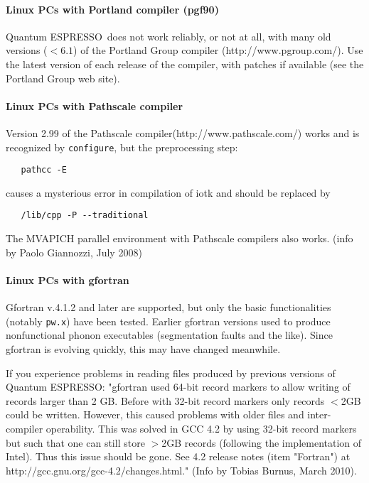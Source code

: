 \documentclass[12pt,a4paper]{article}
\def\qe{{\sc Quantum ESPRESSO}}
\def\pw.x{\texttt{pw.x}}
\def\configure{\texttt{configure}}
\begin{document}
\paragraph{Linux PCs with Portland compiler (pgf90)}

\qe\ does not work reliably, or not at all, with many old
versions ($< 6.1$) of the Portland Group compiler 
(http://www.pgroup.com/). Use the latest version of each 
release of the compiler, with patches if available (see
the Portland Group web site).

\paragraph{Linux PCs with Pathscale compiler}

Version 2.99 of the Pathscale compiler(http://www.pathscale.com/)
works and is recognized by
\configure, but the preprocessing step:
\begin{verbatim}
   pathcc -E
\end{verbatim}
causes a mysterious error in compilation of iotk and should be replaced by
\begin{verbatim}
   /lib/cpp -P --traditional
\end{verbatim}
The MVAPICH parallel environment with Pathscale compilers also works.
(info by Paolo Giannozzi, July 2008)

\paragraph{Linux PCs with gfortran}

Gfortran v.4.1.2 and later are supported, but only the basic functionalities 
(notably \pw.x) have been tested.  Earlier gfortran versions used to produce
nonfunctional phonon executables (segmentation faults and the like). Since
gfortran is evolving quickly, this may have changed meanwhile.

If you experience problems in reading files produced by previous versions
of \qe: "gfortran used 64-bit record markers to allow writing of records 
larger than 2 GB. Before with 32-bit record markers only records $<$2GB 
could be written. However, this caused problems with older files and 
inter-compiler operability. This was solved in GCC 4.2 by using 32-bit 
record markers but such that one can still store $>$2GB records (following 
the implementation of Intel). Thus this issue should be gone. See 4.2 
release notes (item "Fortran") at http://gcc.gnu.org/gcc-4.2/changes.html."
(Info by Tobias Burnus, March 2010).
\end{document}

